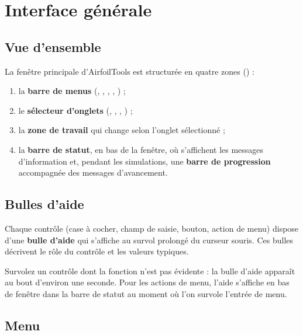 \chapter{Interface générale}
\label{chap:interface}

\section{Vue d'ensemble}

La fenêtre principale d'AirfoilTools est structurée en quatre
zones () :

\begin{enumerate}
    \item la \textbf{barre de menus} (, ,
        , , ) ;
    \item le \textbf{sélecteur d'onglets} (,
        , ,
        ) ;
    \item la \textbf{zone de travail} qui change selon l'onglet
        sélectionné ;
    \item la \textbf{barre de statut}, en bas de la fenêtre, où
        s'affichent les messages d'information et, pendant les
        simulations, une \textbf{barre de progression} accompagnée
        des messages d'avancement.
\end{enumerate}

\section{Bulles d'aide}

Chaque contrôle (case à cocher, champ de saisie, bouton, action
de menu) dispose d'une \textbf{bulle d'aide} qui s'affiche au
survol prolongé du curseur souris. Ces bulles décrivent le rôle
du contrôle et les valeurs typiques.

\begin{astuce}
Survolez un contrôle dont la fonction n'est pas évidente :
la bulle d'aide apparaît au bout d'environ une seconde.
Pour les actions de menu, l'aide s'affiche en bas de
fenêtre dans la barre de statut au moment où l'on survole
l'entrée de menu.
\end{astuce}

\section{Menu }

